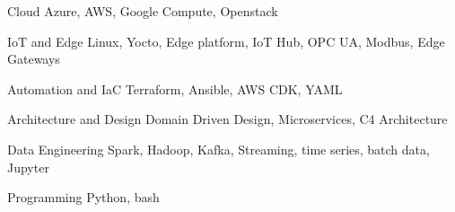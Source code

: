 


\begin{cvskills}


\cvskill
{Cloud} %
{Azure, AWS, Google Compute, Openstack} %

\cvskill
{IoT and Edge} %
{Linux, Yocto, Edge platform, IoT Hub, OPC UA, Modbus, Edge Gateways} %


\cvskill
{Automation and IaC} %
{Terraform, Ansible, AWS CDK, YAML} %


\cvskill
{Architecture and Design} %
{Domain Driven Design, Microservices, C4 Architecture} %


\cvskill
{Data Engineering} %
{Spark, Hadoop, Kafka, Streaming, time series, batch data, Jupyter} %


\cvskill
{Programming} %
{Python, bash} %


\end{cvskills}
